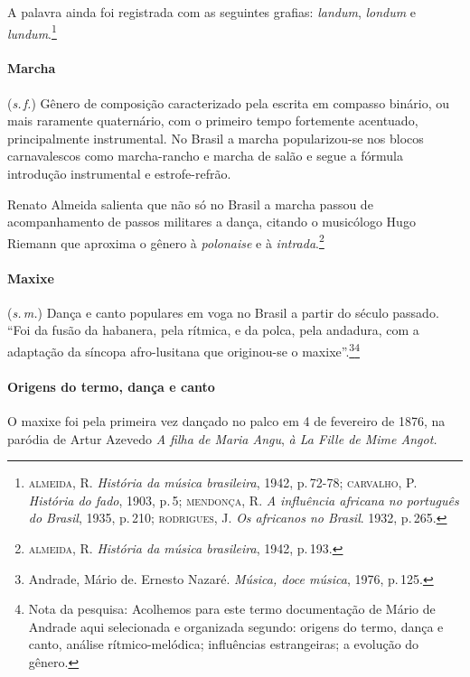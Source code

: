 A palavra ainda foi registrada com as seguintes grafias: \textit{landum}, \textit{londum}
e \textit{lundum}.\footnote{\textsc{almeida}, R. \textit{História da música brasileira}, 1942, p.\,72-78;
\textsc{carvalho}, P. \textit{História do fado}, 1903, p.\,5; \textsc{mendonça}, R. \textit{A influência
africana no português do Brasil}, 1935, p.\,210; \textsc{rodrigues}, J. \textit{Os africanos
no Brasil}. 1932, p.\,265.}

\paragraph{Marcha} (\textit{s.\,f.}) Gênero de composição caracterizado pela escrita
em compasso binário, ou mais raramente quaternário, com o primeiro tempo
fortemente acentuado, principalmente instrumental. No Brasil a marcha
popularizou-se nos blocos carnavalescos como marcha-rancho e marcha de
salão e segue a fórmula introdução instrumental e estrofe-refrão.

Renato Almeida salienta que não só no Brasil a marcha passou de
acompanhamento de passos militares a dança, citando o musicólogo Hugo
Riemann que aproxima o gênero à \textit{polonaise} e à \textit{intrada}.\footnote{\textsc{almeida}, R. \textit{História da música brasileira}, 1942, p.\,193.}

\paragraph{Maxixe} (\textit{s.\,m.}) Dança e canto populares em voga no Brasil a
partir do século passado. ``Foi da fusão da habanera, pela rítmica, e da
polca, pela andadura, com a adaptação da síncopa afro-lusitana que
originou-se o maxixe''.\footnote{Andrade, Mário de. Ernesto Nazaré. \textit{Música,
doce música}, 1976, p.\,125.}\footnote{Nota da pesquisa: Acolhemos para este termo documentação de Mário de Andrade aqui selecionada e organizada segundo: origens do termo, dança e canto, análise rítmico-melódica; influências estrangeiras; a evolução do gênero.}


\paragraph{Origens do termo, dança e canto} O maxixe foi pela primeira vez dançado no palco em 4 de fevereiro de 1876, na paródia de Artur Azevedo \textit{A filha de Maria Angu}, \textit{à
La Fille de Mime Angot.}

